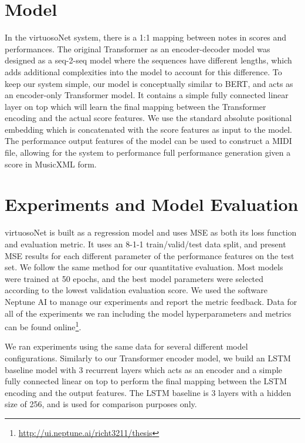 \section{Model}
In the virtuosoNet system, there is a 1:1 mapping between notes in scores and performances. The original Transformer as an encoder-decoder model was designed as a seq-2-seq model where the sequences have different lengths, which adds additional complexities into the model to account for this difference. To keep our system simple, our model is conceptually similar to BERT, and acts as an encoder-only Transformer model.  It contains a simple fully connected linear layer on top which will learn the final mapping between the Transformer encoding and the actual score features. We use the standard absolute positional embedding which is concatenated with the score features as input to the model. The performance output features of the model can be used to construct a MIDI file, allowing for the system to performance full performance generation given a score in MusicXML form. 

\section{Experiments and Model Evaluation}\label{sec:experiments-and-evaluation}
virtuosoNet is built as a regression model and uses MSE as both its loss function and evaluation metric. It uses an 8-1-1 train/valid/test data split, and \citet{jeong2019virtuosonet} present MSE results for each different parameter of the performance features on the test set. We follow the same method for our quantitative evaluation. Most models were trained at 50 epochs, and the best model parameters were selected according to the lowest validation evaluation score. We used the software Neptune AI \cite{neptune} to manage our experiments and report the metric feedback. Data for all of the experiments we ran including the model hyperparameters and metrics can be found online\footnote{\url{http://ui.neptune.ai/richt3211/thesis}}. 

We ran experiments using the same data for several different model configurations. Similarly to our Transformer encoder model, we build an LSTM baseline model with 3 recurrent layers which acts as an encoder and a simple fully connected linear on top to perform the final mapping between the LSTM encoding and the output features. The LSTM baseline is 3 layers with a hidden size of 256, and is used for comparison purposes only. 


